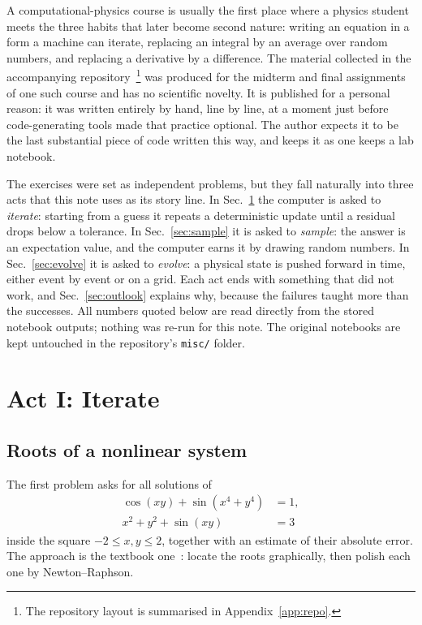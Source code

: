 \documentclass[aps,pra,twocolumn,superscriptaddress,floatfix,nofootinbib]{revtex4-2}
\begin{document}
A computational-physics course is usually the first place where a physics student meets the three habits that later become second nature: writing an equation in a form a machine can iterate, replacing an integral by an average over random numbers, and replacing a derivative by a difference. The material collected in the accompanying repository~\footnote{The repository layout is summarised in Appendix~\ref{app:repo}.} was produced for the midterm and final assignments of one such course and has no scientific novelty. It is published for a personal reason: it was written entirely by hand, line by line, at a moment just before code-generating tools made that practice optional. The author expects it to be the last substantial piece of code written this way, and keeps it as one keeps a lab notebook.

The exercises were set as independent problems, but they fall naturally into three acts that this note uses as its story line. In Sec.~\ref{sec:iterate} the computer is asked to \emph{iterate}: starting from a guess it repeats a deterministic update until a residual drops below a tolerance. In Sec.~\ref{sec:sample} it is asked to \emph{sample}: the answer is an expectation value, and the computer earns it by drawing random numbers. In Sec.~\ref{sec:evolve} it is asked to \emph{evolve}: a physical state is pushed forward in time, either event by event or on a grid. Each act ends with something that did not work, and Sec.~\ref{sec:outlook} explains why, because the failures taught more than the successes. All numbers quoted below are read directly from the stored notebook outputs; nothing was re-run for this note. The original notebooks are kept untouched in the repository's \texttt{misc/} folder.

\section{Act I: Iterate}
\label{sec:iterate}

\subsection{Roots of a nonlinear system}

The first problem asks for all solutions of
\begin{align}
\cos(xy) + \sin(x^4+y^4) &= 1, \nonumber\\
x^2 + y^2 + \sin(xy) &= 3
\label{eq:system}
\end{align}
inside the square $-2\le x,y\le 2$, together with an estimate of their absolute error. The approach is the textbook one~\cite{Ypma1995,NumericalRecipes2007}: locate the roots graphically, then polish each one by Newton--Raphson.
\end{document}
